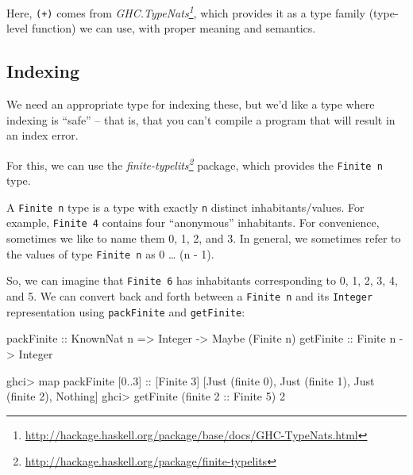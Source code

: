 \documentclass[]{article}
\newenvironment{Shaded}{}{}
\newcommand{\DataTypeTok}[1]{\textcolor[rgb]{0.56,0.13,0.00}{#1}}
\newcommand{\DecValTok}[1]{\textcolor[rgb]{0.25,0.63,0.44}{#1}}
\newcommand{\OtherTok}[1]{\textcolor[rgb]{0.00,0.44,0.13}{#1}}
\newcommand{\FunctionTok}[1]{\textcolor[rgb]{0.02,0.16,0.49}{#1}}
\newcommand{\NormalTok}[1]{#1}
\renewcommand{\href}[2]{#2\footnote{\url{#1}}}
\begin{document}
Here, \texttt{(+)} comes from
\emph{\href{http://hackage.haskell.org/package/base/docs/GHC-TypeNats.html}{GHC.TypeNats}},
which provides it as a type family (type-level function) we can use, with proper
meaning and semantics.

\subsection{Indexing}\label{indexing}

We need an appropriate type for indexing these, but we'd like a type where
indexing is ``safe'' -- that is, that you can't compile a program that will
result in an index error.

For this, we can use the
\emph{\href{http://hackage.haskell.org/package/finite-typelits}{finite-typelits}}
package, which provides the \texttt{Finite\ n} type.

A \texttt{Finite\ n} type is a type with exactly \texttt{n} distinct
inhabitants/values. For example, \texttt{Finite\ 4} contains four ``anonymous''
inhabitants. For convenience, sometimes we like to name them 0, 1, 2, and 3. In
general, we sometimes refer to the values of type \texttt{Finite\ n} as 0
\ldots{} (n - 1).

So, we can imagine that \texttt{Finite\ 6} has inhabitants corresponding to 0,
1, 2, 3, 4, and 5. We can convert back and forth between a \texttt{Finite\ n}
and its \texttt{Integer} representation using \texttt{packFinite} and
\texttt{getFinite}:

\begin{Shaded}
\begin{Highlighting}[]
\OtherTok{packFinite ::} \DataTypeTok{KnownNat}\NormalTok{ n }\OtherTok{=>} \DataTypeTok{Integer}  \OtherTok{->} \DataTypeTok{Maybe}\NormalTok{ (}\DataTypeTok{Finite}\NormalTok{ n)}
\OtherTok{getFinite  ::}               \DataTypeTok{Finite}\NormalTok{ n }\OtherTok{->} \DataTypeTok{Integer}
\end{Highlighting}
\end{Shaded}

\begin{Shaded}
\begin{Highlighting}[]
\NormalTok{ghci}\FunctionTok{>}\NormalTok{ map packFinite [}\DecValTok{0}\FunctionTok{..}\DecValTok{3}\NormalTok{]}\OtherTok{ ::}\NormalTok{ [}\DataTypeTok{Finite} \DecValTok{3}\NormalTok{]}
\NormalTok{[}\DataTypeTok{Just}\NormalTok{ (finite }\DecValTok{0}\NormalTok{), }\DataTypeTok{Just}\NormalTok{ (finite }\DecValTok{1}\NormalTok{), }\DataTypeTok{Just}\NormalTok{ (finite }\DecValTok{2}\NormalTok{), }\DataTypeTok{Nothing}\NormalTok{]}
\NormalTok{ghci}\FunctionTok{>}\NormalTok{ getFinite (finite }\DecValTok{2}\OtherTok{ ::} \DataTypeTok{Finite} \DecValTok{5}\NormalTok{)}
\DecValTok{2}
\end{Highlighting}
\end{Shaded}
\end{document}
